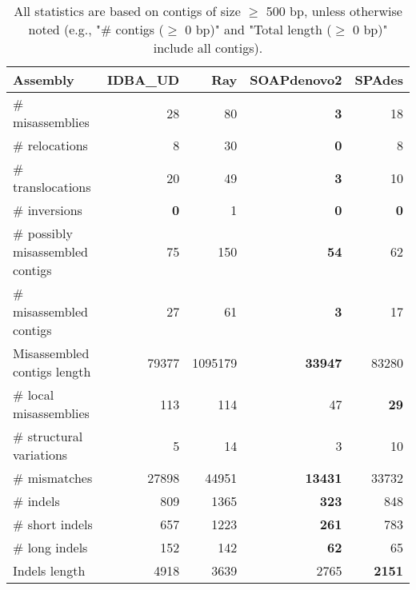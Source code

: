 \documentclass[12pt,a4paper]{article}
\begin{document}
\begin{table}[ht]
\begin{center}
\caption{All statistics are based on contigs of size $\geq$ 500 bp, unless otherwise noted (e.g., "\# contigs ($\geq$ 0 bp)" and "Total length ($\geq$ 0 bp)" include all contigs).}
\begin{tabular}{|l*{4}{|r}|}
\hline
Assembly & IDBA\_UD & Ray & SOAPdenovo2 & SPAdes \\ \hline
\# misassemblies & 28 & 80 & {\bf 3} & 18 \\ \hline
\hspace{5mm}\# relocations & 8 & 30 & {\bf 0} & 8 \\ \hline
\hspace{5mm}\# translocations & 20 & 49 & {\bf 3} & 10 \\ \hline
\hspace{5mm}\# inversions & {\bf 0} & 1 & {\bf 0} & {\bf 0} \\ \hline
\# possibly misassembled contigs & 75 & 150 & {\bf 54} & 62 \\ \hline
\# misassembled contigs & 27 & 61 & {\bf 3} & 17 \\ \hline
Misassembled contigs length & 79377 & 1095179 & {\bf 33947} & 83280 \\ \hline
\# local misassemblies & 113 & 114 & 47 & {\bf 29} \\ \hline
\# structural variations & 5 & 14 & 3 & 10 \\ \hline
\# mismatches & 27898 & 44951 & {\bf 13431} & 33732 \\ \hline
\# indels & 809 & 1365 & {\bf 323} & 848 \\ \hline
\hspace{5mm}\# short indels & 657 & 1223 & {\bf 261} & 783 \\ \hline
\hspace{5mm}\# long indels & 152 & 142 & {\bf 62} & 65 \\ \hline
Indels length & 4918 & 3639 & 2765 & {\bf 2151} \\ \hline
\end{tabular}
\end{center}
\end{table}
\end{document}
